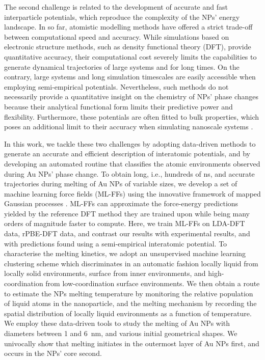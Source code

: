 \documentclass[%
aip,
 amsmath,amssymb,
 reprint,
]{revtex4-1}
\begin{document}
%
The second challenge is related to the development of accurate and fast interparticle potentials, which reproduce the complexity of the NPs' energy landscape. 
%
In so far, atomistic modelling methods have offered a strict trade-off between computational speed and accuracy.
%
While simulations based on electronic structure methods, such as density functional theory (DFT), provide quantitative accuracy, their computational cost severely limits the capabilities to generate dynamical trajectories of large systems and for long times. 
%
On the contrary, large systems and long simulation timescales are easily accessible when employing semi-empirical potentials.
%
Nevertheless, such methods do not necessarily provide a quantitative insight on the chemistry of NPs' phase changes \cite{Ellaby2018} because their analytical functional form limits their predictive power and flexibility.
%
Furthermore, these potentials are often fitted to bulk properties, which poses an additional limit to their accuracy when simulating nanoscale systems \cite{Baletto2002}.
%

In this work, we tackle these two challenges by adopting data-driven methods to generate an accurate and efficient description of interatomic potentials, and by developing an automated routine that classifies the atomic environments observed during Au NPs' phase change.
%
To obtain long, i.e., hundreds of ns, and accurate trajectories during melting of Au NPs of variable sizes, we develop a set of machine learning force fields (ML-FFs)\cite{Rossi2020, Cheng2019, Cooper2020, Deringer2019, Behler2017, Zeni2019, lot2020, xie2021bayesian} using the innovative framework of mapped Gaussian processes \cite{Glielmo2018, Zeni2018, vandermause2020fly}.
%
ML-FFs can approximate the force-energy predictions yielded by the reference DFT method they are trained upon while being many orders of magnitude faster to compute. 
%
Here, we train ML-FFs on LDA-DFT data, rPBE-DFT data, and contrast our results with experimental results, and with predictions found using a semi-empirical interatomic potential.
%
To characterise the melting kinetics, we adopt an unsupervised machine learning clustering scheme which discriminates in an automatic fashion locally liquid from locally solid environments, surface from inner environments, and high-coordination from low-coordination surface environments. 
%
We then obtain a route to estimate the NPs melting temperature by monitoring the relative population of liquid atoms in the nanoparticle, and the melting mechanism by recording the spatial distribution of locally liquid environments as a function of temperature.
%
We employ these data-driven tools to study the melting of Au NPs with diameters between 1 and 6~nm, and various initial geometrical shapes. 
%
We univocally show that melting initiates in the outermost layer of Au NPs first, and occurs in the NPs' core second.
\end{document}

